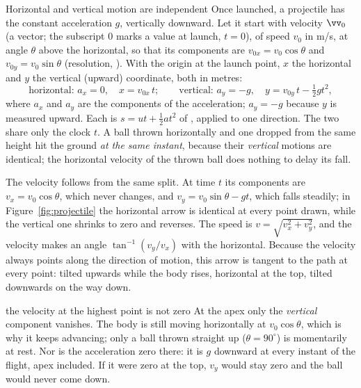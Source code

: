 \begin{keybox}{Horizontal and vertical motion are independent}
Once launched, a projectile has the constant acceleration $g$, vertically downward. Let it start with
velocity $\vv_0$ (a vector; the subscript $0$ marks a value at launch, $t=0$), of speed $v_0$ in
\si{m/s}, at angle $\theta$ above the horizontal, so that its components are
$v_{0x}=v_0\cos\theta$ and $v_{0y}=v_0\sin\theta$ (resolution, ). With the origin at the
launch point, $x$ the horizontal and $y$ the vertical (upward) coordinate, both in metres:
\[
\text{horizontal: } a_x=0,\quad x=v_{0x}\,t;\qquad
\text{vertical: } a_y=-g,\quad y=v_{0y}\,t-\tfrac12 g t^2,
\]
where $a_x$ and $a_y$ are the components of the acceleration; $a_y=-g$ because $y$ is measured upward.
Each is $s=ut+\tfrac12at^2$ of , applied to one direction.
The two share only the clock $t$. A ball thrown horizontally and one dropped from the same height hit
the ground \emph{at the same instant}, because their \emph{vertical} motions are identical; the
horizontal velocity of the thrown ball does nothing to delay its fall.
\end{keybox}

The velocity follows from the same split. At time $t$ its components are $v_x=v_0\cos\theta$, which
never changes, and $v_y=v_0\sin\theta-gt$, which falls steadily; in Figure~\ref{fig:projectile} the
horizontal arrow is identical at every point drawn, while the vertical one shrinks to zero and reverses. The speed is
$v=\sqrt{v_x^2+v_y^2}$, and the velocity makes an angle $\tan^{-1}(v_y/v_x)$ with the horizontal. Because the velocity always points along the direction of motion, this arrow is
tangent to the path at every point: tilted upwards while the body rises, horizontal at the top, tilted
downwards on the way down.

\begin{trapbox}{the velocity at the highest point is not zero}
At the apex only the \emph{vertical} component vanishes. The body is still moving horizontally at
$v_0\cos\theta$, which is why it keeps advancing; only a ball thrown straight up ($\theta=90^\circ$)
is momentarily at rest. Nor is the acceleration zero there: it is $g$ downward at every instant of the
flight, apex included. If it were zero at the top, $v_y$ would stay zero and the ball would never come
down.
\end{trapbox}

\begin{figure}[htbp]
\centering
{}
\end{figure}

